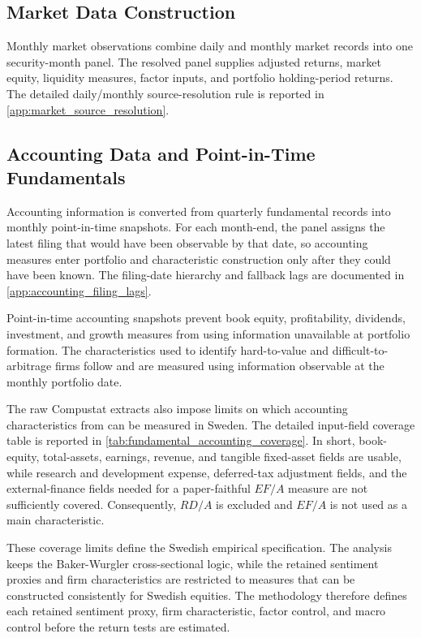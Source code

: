 \documentclass[11pt]{article}
\newcommand{\var}[1]{\ensuremath{#1}}
\begin{document}
\subsection{Market Data Construction}
Monthly market observations combine daily and monthly market records into one security-month panel. The resolved panel supplies adjusted returns, market equity, liquidity measures, factor inputs, and portfolio holding-period returns. The detailed daily/monthly source-resolution rule is reported in \cref{app:market_source_resolution}.

\subsection{Accounting Data and Point-in-Time Fundamentals}
Accounting information is converted from quarterly fundamental records into monthly point-in-time snapshots. For each month-end, the panel assigns the latest filing that would have been observable by that date, so accounting measures enter portfolio and characteristic construction only after they could have been known. The filing-date hierarchy and fallback lags are documented in \cref{app:accounting_filing_lags}.

Point-in-time accounting snapshots prevent book equity, profitability, dividends, investment, and growth measures from using information unavailable at portfolio formation. The characteristics used to identify hard-to-value and difficult-to-arbitrage firms follow \citet{baker2006sentiment} and are measured using information observable at the monthly portfolio date.

The raw Compustat extracts also impose limits on which accounting characteristics from \citet{baker2006sentiment} can be measured in Sweden. The detailed input-field coverage table is reported in \cref{tab:fundamental_accounting_coverage}. In short, book-equity, total-assets, earnings, revenue, and tangible fixed-asset fields are usable, while research and development expense, deferred-tax adjustment fields, and the external-finance fields needed for a paper-faithful \var{EF/A} measure are not sufficiently covered. Consequently, \var{RD/A} is excluded and \var{EF/A} is not used as a main characteristic.

These coverage limits define the Swedish empirical specification. The analysis keeps the Baker-Wurgler cross-sectional logic, while the retained sentiment proxies and firm characteristics are restricted to measures that can be constructed consistently for Swedish equities. The methodology therefore defines each retained sentiment proxy, firm characteristic, factor control, and macro control before the return tests are estimated.
\end{document}
